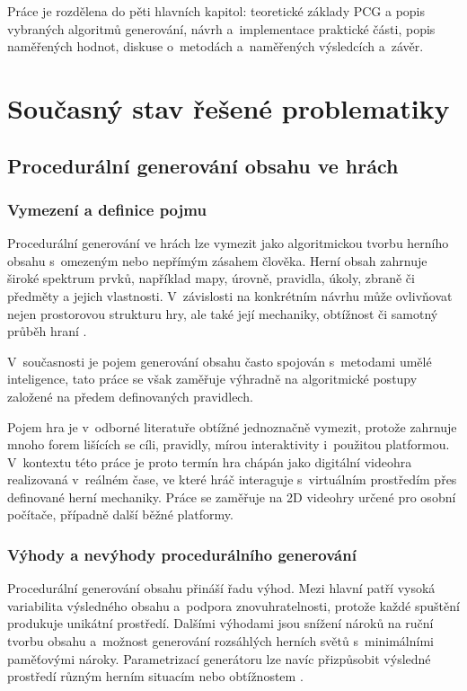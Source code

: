 \documentclass[
   program=itk,
   biblatex,
   figures=true,
   tables=true,
   glossaries,
   index
]{kidiplom}
\begin{document}
Práce je rozdělena do pěti hlavních kapitol: teoretické základy PCG a popis vybraných algoritmů generování, návrh a~implementace praktické části, popis naměřených hodnot, diskuse o~metodách a~naměřených výsledcích a~závěr.

\section{Současný stav řešené problematiky}

\subsection{Procedurální generování obsahu ve hrách}

\subsubsection{Vymezení a definice pojmu}
Procedurální generování ve hrách lze vymezit jako algoritmickou tvorbu herního obsahu s~omezeným nebo nepřímým zásahem člověka. Herní obsah zahrnuje široké spektrum prvků, například mapy, úrovně, pravidla, úkoly, zbraně či předměty a jejich vlastnosti. V~závislosti na konkrétním návrhu může ovlivňovat nejen prostorovou strukturu hry, ale také její mechaniky, obtížnost či samotný průběh hraní \cite{Shaker2016}.

V~současnosti je pojem generování obsahu často spojován s~metodami umělé inteligence, tato práce se však zaměřuje výhradně na algoritmické postupy založené na předem definovaných pravidlech.

Pojem hra je v~odborné literatuře obtížné jednoznačně vymezit, protože zahrnuje mnoho forem lišících se cíli, pravidly, mírou interaktivity i~použitou platformou. V~kontextu této práce je proto termín hra chápán jako digitální videohra realizovaná v~reálném čase, ve které hráč interaguje s~virtuálním prostředím přes definované herní mechaniky. Práce se zaměřuje na 2D videohry určené pro osobní počítače, případně další běžné platformy.

\subsubsection{Výhody a nevýhody procedurálního generování}
Procedurální generování obsahu přináší řadu výhod. Mezi hlavní patří vysoká variabilita výsledného obsahu a~podpora znovuhratelnosti, protože každé spuštění produkuje unikátní prostředí. Dalšími výhodami jsou snížení nároků na ruční tvorbu obsahu a~možnost generování rozsáhlých herních světů s~minimálními paměťovými nároky. Parametrizací generátoru lze navíc přizpůsobit výsledné prostředí různým herním situacím nebo obtížnostem \cite{Shaker2016,Linden2014}.
\end{document}
